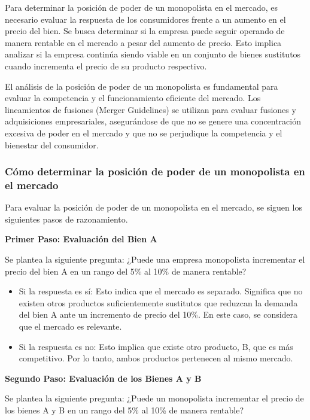 \documentclass[
  a4paper,
]{article}
\theoremstyle{definition}
\theoremstyle{remark}
\begin{document}
Para determinar la posición de poder de un monopolista en el mercado, es
necesario evaluar la respuesta de los consumidores frente a un aumento
en el precio del bien. Se busca determinar si la empresa puede seguir
operando de manera rentable en el mercado a pesar del aumento de precio.
Esto implica analizar si la empresa continúa siendo viable en un
conjunto de bienes sustitutos cuando incrementa el precio de su producto
respectivo.

El análisis de la posición de poder de un monopolista es fundamental
para evaluar la competencia y el funcionamiento eficiente del mercado.
Los lineamientos de fusiones (Merger Guidelines) se utilizan para
evaluar fusiones y adquisiciones empresariales, asegurándose de que no
se genere una concentración excesiva de poder en el mercado y que no se
perjudique la competencia y el bienestar del consumidor.

\hypertarget{cuxf3mo-determinar-la-posiciuxf3n-de-poder-de-un-monopolista-en-el-mercado}{%
\subsubsection{Cómo determinar la posición de poder de un monopolista en
el
mercado}\label{cuxf3mo-determinar-la-posiciuxf3n-de-poder-de-un-monopolista-en-el-mercado}}

Para evaluar la posición de poder de un monopolista en el mercado, se
siguen los siguientes pasos de razonamiento.

\textbf{Primer Paso: Evaluación del Bien A}

Se plantea la siguiente pregunta: ¿Puede una empresa monopolista
incrementar el precio del bien A en un rango del 5\% al 10\% de manera
rentable?

\begin{itemize}
\item
  Si la respuesta es sí: Esto indica que el mercado es separado.
  Significa que no existen otros productos suficientemente sustitutos
  que reduzcan la demanda del bien A ante un incremento de precio del
  10\%. En este caso, se considera que el mercado es relevante.
\item
  Si la respuesta es no: Esto implica que existe otro producto, B, que
  es más competitivo. Por lo tanto, ambos productos pertenecen al mismo
  mercado.
\end{itemize}

\textbf{Segundo Paso: Evaluación de los Bienes A y B}

Se plantea la siguiente pregunta: ¿Puede un monopolista incrementar el
precio de los bienes A y B en un rango del 5\% al 10\% de manera
rentable?
\end{document}
